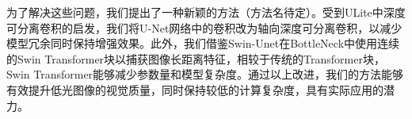 \documentclass[a4paper, 10pt]{article}
\begin{document}
		为了解决这些问题，我们提出了一种新颖的方法（方法名待定）。受到ULite\cite{dinh20231m}中深度可分离卷积的启发，我们将U-Net网络中的卷积改为轴向深度可分离卷积，以减少模型冗余同时保持增强效果。此外，我们借鉴Swin-Unet\cite{cao2022swin}在BottleNeck中使用连续的Swin Transformer块以捕获图像长距离特征，相较于传统的Transformer块，Swin Transformer能够减少参数量和模型复杂度。通过以上改进，我们的方法能够有效提升低光图像的视觉质量，同时保持较低的计算复杂度，具有实际应用的潜力。
		
		
\end{document}
